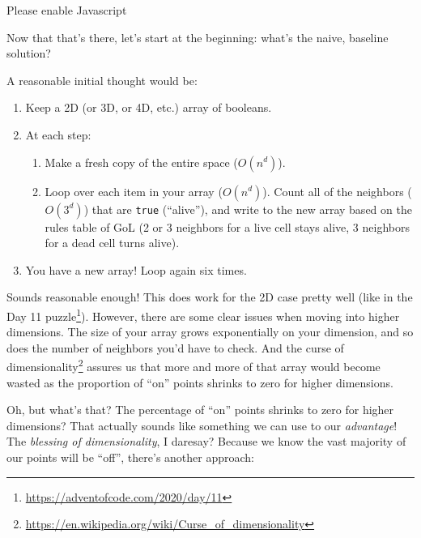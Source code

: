 \documentclass[]{article}
\renewcommand{\href}[2]{#2\footnote{\url{#1}}}
\begin{document}
\leavevmode\hypertarget{gol2DCont}{}%
Please enable Javascript

Now that that's there, let's start at the beginning: what's the naive, baseline
solution?

A reasonable initial thought would be:

\begin{enumerate}
\def\labelenumi{\arabic{enumi}.}
\tightlist
\item
  Keep a 2D (or 3D, or 4D, etc.) array of booleans.
\item
  At each step:

  \begin{enumerate}
  \def\labelenumii{\alph{enumii}.}
  \tightlist
  \item
    Make a fresh copy of the entire space (\(O(n^d)\)).
  \item
    Loop over each item in your array (\(O(n^d)\)). Count all of the neighbors
    (\(O(3^d)\)) that are \texttt{true} (``alive''), and write to the new array
    based on the rules table of GoL (2 or 3 neighbors for a live cell stays
    alive, 3 neighbors for a dead cell turns alive).
  \end{enumerate}
\item
  You have a new array! Loop again six times.
\end{enumerate}

Sounds reasonable enough! This does work for the 2D case pretty well (like in
the \href{https://adventofcode.com/2020/day/11}{Day 11 puzzle}). However, there
are some clear issues when moving into higher dimensions. The size of your array
grows exponentially on your dimension, and so does the number of neighbors you'd
have to check. And the
\href{https://en.wikipedia.org/wiki/Curse_of_dimensionality}{curse of
dimensionality} assures us that more and more of that array would become wasted
as the proportion of ``on'' points shrinks to zero for higher dimensions.

Oh, but what's that? The percentage of ``on'' points shrinks to zero for higher
dimensions? That actually sounds like something we can use to our
\emph{advantage}! The \emph{blessing of dimensionality}, I daresay? Because we
know the vast majority of our points will be ``off'', there's another approach:
\end{document}
